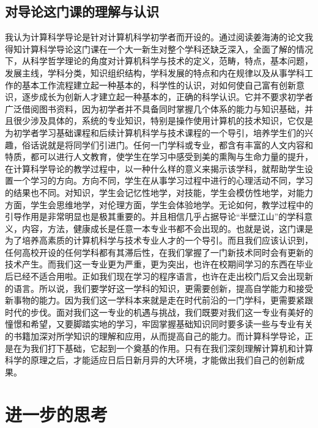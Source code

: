 \documentclass{article}
\begin{document}
\subsection{对导论这门课的理解与认识}
我认为计算科学导论是针对计算机科学初学者而开设的。通过阅读姜海涛的论文\cite{ref3}我得知计算科学导论这门课在一个大一新生对整个学科还缺乏深入，全面了解的情况下，从科学哲学理论的角度对计算机科学与技术的定义，范畴，特点，基本问题，发展主线，学科分类，知识组织结构，学科发展的特点和内在规律以及从事学科工作的基本工作流程建立起一种基本的，科学性的认识，对如何使自己富有创新意识，逐步成长为创新人才建立起一种基本的，正确的科学认识。它并不要求初学者广泛借阅图书资料，因为初学者并不具备同时掌握几个体系的能力与知识基础，并且很少涉及具体的，系统的专业知识，特别是操作使用计算机的技术知识，它仅是为初学者学习基础课程和后续计算机科学与技术课程的一个导引，培养学生们的兴趣，俗话说就是将同学们引进门。任何一门学科或专业，都含有丰富的人文内容和特质，都可以进行人文教育，使学生在学习中感受到美的熏陶与生命力量的提升，在计算科学导论的教学过程中，以一种什么样的意义来揭示该学科，就帮助学生设置一个学习的方向。方向不同，学生在从事学习过程中进行的心理活动不同，学习的结果也不同。对知识，学生会记忆性地学，对技能，学生会模仿性地学，对能力方面，学生会思维地学，对伦理方面，学生会体验地学。无论如何，教学过程中的引导作用是非常明显也是极其重要的。并且相信几乎占据导论“半壁江山”的学科意义，内容，方法，健康成长是任意一本专业书都不会出现的。也就是说，这门课是为了培养高素质的计算机科学与技术专业人才的一个导引。而且我们应该认识到，任何高校开设的任何学科都有其滞后性，在我们掌握了一门新技术同时会有更新的技术产生。而我们这一专业更为严重，更为突出，也许在校期间学习的东西在毕业后已经不适合用啦。正如我们现在学习的程序语言，也许在走出校门后又会出现新的语言。所以说，我们要学好这一学科的知识，更需要创新，提高自学能力和接受新事物的能力。因为我们这一学科本来就是走在时代前沿的一门学科，更需要紧跟时代的步伐。面对我们这一专业的机遇与挑战，我们既要对我们这一专业有美好的憧憬和希望，又要脚踏实地的学习，牢固掌握基础知识同时要多读一些与专业有关的书籍加深对所学知识的理解和应用，从而提高自己的能力。而计算科学导论，正是在为我们打下基础，它起到一个奠基的作用。只有在我们深刻理解计算机和计算科学的原理之后，才能适应日后日新月异的大环境，才能做出我们自己的创新成果。                                                                                                                                                 \section{进一步的思考}
\end{document}
